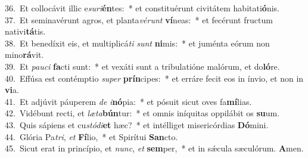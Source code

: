 {36.~}Et collocávit illic e\textit{su}\textit{ri}\textbf{én}tes:~* et constituérunt civitátem habitati\textbf{ó}nis.\\
{37.~}Et seminavérunt agros, et planta\textit{vé}\textit{runt} \textbf{ví}neas:~* et fecérunt fructum nativi\textbf{tá}tis.\\
{38.~}Et benedíxit eis, et multiplicá\textit{ti} \textit{sunt} \textbf{ni}mis:~* et juménta eórum non mino\textbf{rá}vit.\\
{39.~}Et \textit{pau}\textit{ci} \textbf{fa}cti sunt:~* et vexáti sunt a tribulatióne malórum, et do\textbf{ló}re.\\
{40.~}Effúsa est contémptio \textit{su}\textit{per} \textbf{prín}cipes:~* et erráre fecit eos in ínvio, et non in \textbf{vi}a.\\
{41.~}Et adjúvit páuperem \textit{de} \textit{i}\textbf{nó}pia:~* et pósuit sicut oves fa\textbf{mí}lias.\\
{42.~}Vidébunt recti, et \textit{læ}\textit{ta}\textbf{bún}tur:~* et omnis iníquitas oppilábit os \textbf{su}um.\\
{43.~}Quis sápiens et cu\textit{stó}\textit{di}\textbf{et} hæc?~* et intélliget misericórdias \textbf{Dó}mini.\\
{44.~}Glória Pa\textit{tri}, \textit{et} \textbf{Fí}lio,~* et Spirítui \textbf{San}cto.\\
{45.~}Sicut erat in princípio, et \textit{nunc}, \textit{et} \textbf{sem}per,~* et in sǽcula sæculórum. \textbf{A}men.\\
